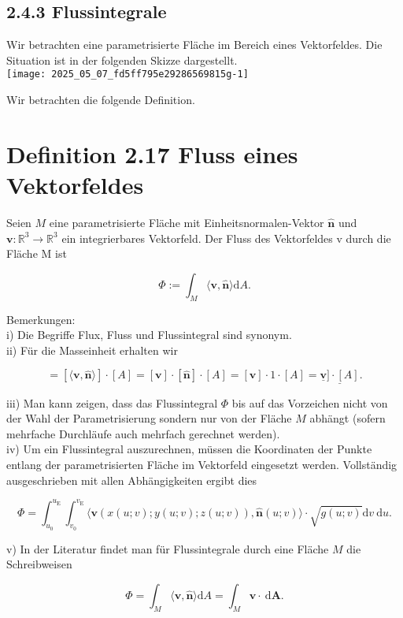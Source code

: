 \documentclass[10pt]{article}
\begin{document}
\subsection*{2.4.3 Flussintegrale}
Wir betrachten eine parametrisierte Fläche im Bereich eines Vektorfeldes. Die Situation ist in der folgenden Skizze dargestellt.\\
\texttt{[image: 2025\_05\_07\_fd5ff795e29286569815g-1]}

Wir betrachten die folgende Definition.

\section*{Definition 2.17 Fluss eines Vektorfeldes}
Seien $M$ eine parametrisierte Fläche mit Einheitsnormalen-Vektor $\hat{\mathbf{n}}$ und $\mathbf{v}: \mathbb{R}^{3} \rightarrow \mathbb{R}^{3}$ ein integrierbares Vektorfeld. Der Fluss des Vektorfeldes v durch die Fläche M ist


\begin{equation*}
\Phi:=\int_{M}\langle\mathbf{v}, \hat{\mathbf{n}}\rangle \mathrm{d} A . \tag{2.121}
\end{equation*}


Bemerkungen:\\
i) Die Begriffe Flux, Fluss und Flussintegral sind synonym.\\
ii) Für die Masseinheit erhalten wir


\begin{equation*}
[\Phi]=[\langle\mathbf{v}, \hat{\mathbf{n}}\rangle] \cdot[A]=[\mathbf{v}] \cdot[\hat{\mathbf{n}}] \cdot[A]=[\mathbf{v}] \cdot 1 \cdot[A]=\underline{\underline{\mathbf{v}}] \cdot[A]} . \tag{2.122}
\end{equation*}


iii) Man kann zeigen, dass das Flussintegral $\Phi$ bis auf das Vorzeichen nicht von der Wahl der Parametrisierung sondern nur von der Fläche $M$ abhängt (sofern mehrfache Durchläufe auch mehrfach gerechnet werden).\\
iv) Um ein Flussintegral auszurechnen, müssen die Koordinaten der Punkte entlang der parametrisierten Fläche im Vektorfeld eingesetzt werden. Vollständig ausgeschrieben mit allen Abhängigkeiten ergibt dies


\begin{equation*}
\Phi=\int_{u_{0}}^{u_{\mathrm{E}}} \int_{v_{0}}^{v_{\mathrm{E}}}\langle\mathbf{v}(x(u ; v) ; y(u ; v) ; z(u ; v)), \hat{\mathbf{n}}(u ; v)\rangle \cdot \sqrt{g(u ; v)} \mathrm{d} v \mathrm{~d} u . \tag{2.123}
\end{equation*}


v) In der Literatur findet man für Flussintegrale durch eine Fläche $M$ die Schreibweisen


\begin{equation*}
\Phi=\int_{M}\langle\mathbf{v}, \hat{\mathbf{n}}\rangle \mathrm{d} A=\int_{M} \mathbf{v} \cdot \mathrm{~d} \mathbf{A} . \tag{2.124}
\end{equation*}
\end{document}
